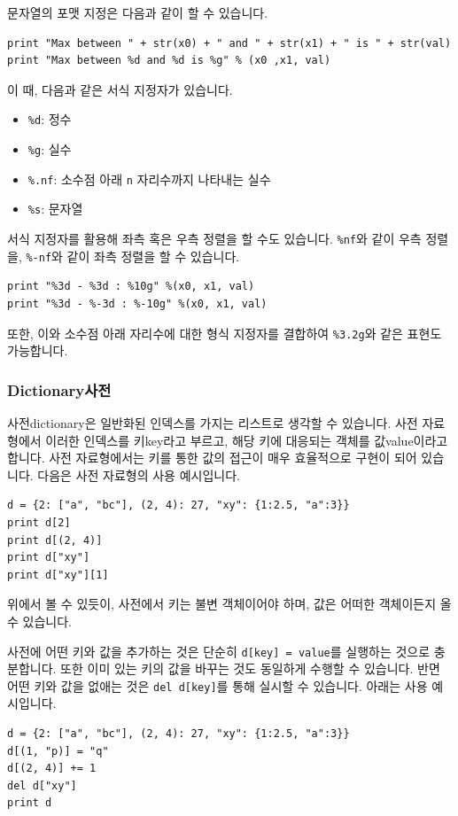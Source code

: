 \documentclass[../main.tex]{subfiles}
\begin{document}
문자열의 포맷 지정은 다음과 같이 할 수 있습니다.
\begin{verbatim}
print "Max between " + str(x0) + " and " + str(x1) + " is " + str(val)
print "Max between %d and %d is %g" % (x0 ,x1, val)
\end{verbatim}
이 때, 다음과 같은 서식 지정자가 있습니다.
\begin{itemize}
	\item \texttt{\%d}: 정수
	\item \texttt{\%g}: 실수
	\item \texttt{\%.nf}: 소수점 아래 \texttt{n} 자리수까지 나타내는 실수
	\item \texttt{\%s}: 문자열
\end{itemize}
서식 지정자를 활용해 좌측 혹은 우측 정렬을 할 수도 있습니다.
\texttt{\%nf}와 같이 우측 정렬을, \texttt{\%-nf}와 같이 좌측 정렬을 할 수 있습니다.
\begin{verbatim}
print "%3d - %3d : %10g" %(x0, x1, val)
print "%3d - %-3d : %-10g" %(x0, x1, val)
\end{verbatim}
또한, 이와 소수점 아래 자리수에 대한 형식 지정자를 결합하여 \texttt{\%3.2g}와 같은 표현도 가능합니다.

\subsubsection{Dictionary사전}
사전dictionary은 일반화된 인덱스를 가지는 리스트로 생각할 수 있습니다.
사전 자료형에서 이러한 인덱스를 키key라고 부르고, 해당 키에 대응되는 객체를 값value이라고 합니다.
사전 자료형에서는 키를 통한 값의 접근이 매우 효율적으로 구현이 되어 있습니다.
다음은 사전 자료형의 사용 예시입니다.
\begin{verbatim}
d = {2: ["a", "bc"], (2, 4): 27, "xy": {1:2.5, "a":3}}
print d[2]
print d[(2, 4)]
print d["xy"]
print d["xy"][1]
\end{verbatim}
위에서 볼 수 있듯이, 사전에서 키는 불변 객체이어야 하며, 값은 어떠한 객체이든지 올 수 있습니다.

사전에 어떤 키와 값을 추가하는 것은 단순히 \texttt{d[key] = value}를 실행하는 것으로 충분합니다.
또한 이미 있는 키의 값을 바꾸는 것도 동일하게 수행할 수 있습니다.
반면 어떤 키와 값을 없애는 것은 \texttt{del d[key]}를 통해 실시할 수 있습니다.
아래는 사용 예시입니다.
\begin{verbatim}
d = {2: ["a", "bc"], (2, 4): 27, "xy": {1:2.5, "a":3}}
d[(1, "p)] = "q"
d[(2, 4)] += 1
del d["xy"]
print d
\end{verbatim}
\end{document}
